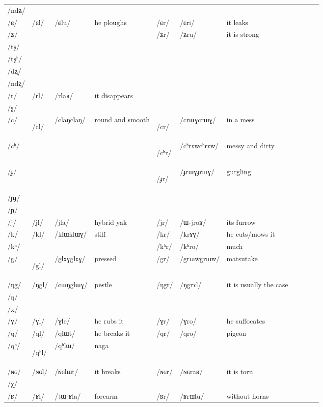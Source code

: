 \documentclass[oneside,a4paper,11pt]{article}
\newcommand{\ipa}[1]{\mbox{\phon/#1/}}
\newcommand{\deux}[1]{\ipa{#1}\addtocounter{2clusters}{1}}
\newcommand{\tib}[1]{\cellcolor{lightgray}\textbf{#1}}
\newcommand{\idph}[1]{\cellcolor{gray}\textbf{#1}}
\begin{document}
\begin{table}
{\begin{tabular}{l|lll|lll|lll|l}
\ipa{ndʑ} 	&  	&  	&  	&  	&  	& \\	
\ipa{ɕ} 	& \deux{ɕl} 	& \ipa{ɕlu} 	&he ploughs  	& \deux{ɕr} 	& \ipa{ɕri} 	& it leaks\\	
\ipa{ʑ} 	&  	&   	&  	& \deux{ʑr} 	& \ipa{ʑru} 	&it is strong \\	
\ipa{tʂ} 	&  	&  	&  	&  	&  	& \\	
\ipa{tʂʰ} 	&  	&  	&  	&  	&  	& \\	
\ipa{dʐ} 	&  	&  	&  	&  	&  	& \\	
\ipa{ndʐ} 	&  	&  	&  	&  	&  	& \\	
\ipa{r} 	& \deux{rl} 	& \ipa{rlaʁ} 	&it disappears  	&  	&  	& \\	
\ipa{ʂ} 	&  	&  	&  	&  	&  	& \\	
\ipa{c} 	& \deux{cl} \idph{}	& \ipa{claŋclaŋ} 	& round and smooth 	& \deux{cr} \idph{}	& \ipa{crɯɣcrɯɣ} 	& in a mess \\	
\ipa{cʰ} 	&  	&  	&  	& \deux{cʰr}\idph{} 	& \ipa{cʰrɤwcʰrɤw} 	& messy and dirty\\	
\ipa{ɟ} 	&  	&  	&  	& \deux{ɟr} \idph{}	& \ipa{ɟrɯɣɟrɯɣ} 	& gurgling\\	
\ipa{ɲɟ} 	&  	&  	&  	&  	&  	& \\	
\ipa{ɲ} 	&  	&  	&  	&  	&  	& \\	
\ipa{j} 	& \deux{jl} 	& \ipa{jla} 	& hybrid yak 	& \deux{jr} 	& \ipa{ɯ-jroʁ} 	&its furrow \\	
\ipa{k} 	& \deux{kl} 	& \ipa{klɯklɯɣ} 	&stiff  	& \deux{kr} 	& \ipa{krɤɣ} 	& he cuts/mows it\\	
\ipa{kʰ} 	&  	&  	&  	& \deux{kʰr} 	& \ipa{kʰro} 	&much \\	
\ipa{g} 	& \deux{gl} \idph{}	& \ipa{glɤɣglɤɣ} 	& pressed 	& \deux{gr} 	& \ipa{grɯwgrɯw} 	&matsutake \\	
\ipa{ŋg} 	& \deux{ŋgl} 	& \ipa{cɯŋglɯɣ} 	&pestle  	& \deux{ŋgr} 	& \ipa{ŋgrɤl} 	&it is usually the case \\	
\ipa{ŋ} 	&  	&  	&  	&  	&  	& \\	
\ipa{x} 	&  	&  	&  	&  	&  	& \\	
\ipa{ɣ} 	& \deux{ɣl} 	& \ipa{ɣle} 	&he rubs it  	& \deux{ɣr} 	& \ipa{ɣro} 	& he suffocates\\	
\ipa{q} 	& \deux{ql} 	& \ipa{qlɯt} 	& he breaks it 	& \deux{qr} 	& \ipa{qro} 	& pigeon\\	
\ipa{qʰ} 	& \deux{qʰl} \tib{}	& \ipa{qʰlɯ} 	&naga  	&  	&  	& \\	
\ipa{ɴɢ} 	& \deux{ɴɢl} 	& \ipa{ɴɢlɯt} 	& it breaks 	& \deux{ɴɢr} 	& \ipa{ɴɢraʁ} 	&it is torn \\	
\ipa{χ} 	&  	&  	&  	&  	&  	& \\	
\ipa{ʁ} 	& \deux{ʁl} 	& \ipa{tɯ-ʁla} 	& forearm 	& \deux{ʁr} 	& \ipa{ʁrɯlu} 	& without horns\\	
\midrule							
\end{tabular}}
\end{table}
\end{document}
